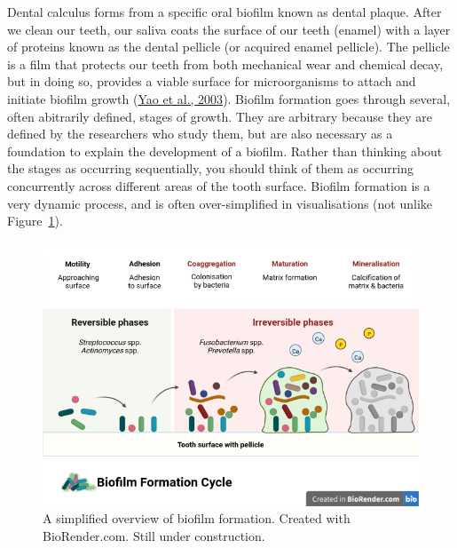 \documentclass[
  letterpaper,
]{book}
\begin{document}
Dental calculus forms from a specific oral biofilm known as dental
plaque. After we clean our teeth, our saliva coats the surface of our
teeth (enamel) with a layer of proteins known as the dental pellicle (or
acquired enamel pellicle). The pellicle is a film that protects our
teeth from both mechanical wear and chemical decay, but in doing so,
provides a viable surface for microorganisms to attach and initiate
biofilm growth (\protect\hyperlink{ref-yaoIdentificationProtein2003}{Yao
et al., 2003}). Biofilm formation goes through several, often abitrarily
defined, stages of growth. They are arbitrary because they are defined
by the researchers who study them, but are also necessary as a
foundation to explain the development of a biofilm. Rather than thinking
about the stages as occurring sequentially, you should think of them as
occurring concurrently across different areas of the tooth surface.
Biofilm formation is a very dynamic process, and is often
over-simplified in visualisations (not unlike
Figure~\ref{fig-biofilm-form}).

\begin{figure}

{\centering \includegraphics{./figures/biofilm_formation.png}

}

\caption{\label{fig-biofilm-form}A simplified overview of biofilm
formation. Created with BioRender.com. Still under construction.}

\end{figure}
\end{document}
